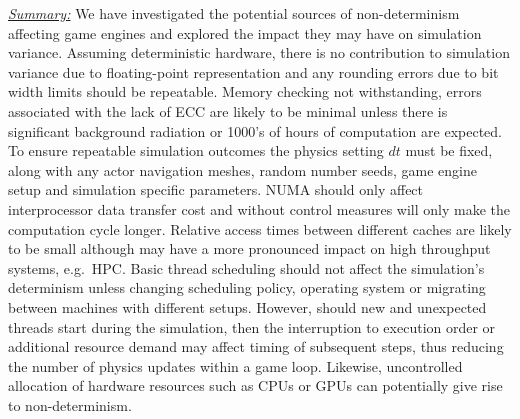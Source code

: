 \documentclass[letterpaper, 10 pt, journal, twoside]{IEEEtran}
\begin{document}
\noindent\underline{\textit{Summary:}}
We have investigated the potential sources of non-determinism affecting game engines 
and explored the impact they may have on simulation variance. 
%
Assuming deterministic hardware, there is no contribution to simulation variance due to floating-point representation and any rounding errors due to bit width limits should be repeatable. 
%
Memory checking not withstanding, errors associated with the lack of ECC are likely to be minimal unless there is significant background radiation or 1000's of hours of computation are expected.
%
To ensure repeatable simulation outcomes the physics setting $dt$ must be fixed, along with any actor navigation meshes, random number seeds, game engine setup and simulation specific parameters.
%
NUMA should only affect interprocessor data transfer cost and without control measures will only make the computation cycle longer. Relative access times between different caches are likely to be small although may have a more pronounced impact on high throughput systems, e.g.\ HPC. 
%
Basic thread scheduling should not affect the simulation's determinism unless changing scheduling policy, operating system or migrating between machines with different setups. 
%
However, should new and unexpected threads start during the simulation, then the interruption to execution order or additional resource demand may affect timing of subsequent steps, thus reducing the number of physics updates within a game loop. Likewise, uncontrolled allocation of hardware resources such as CPUs or GPUs can potentially give rise to non-determinism. 
%
\end{document}
